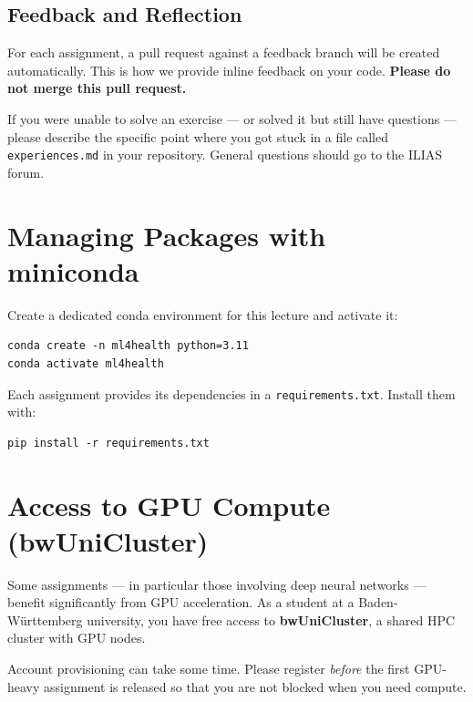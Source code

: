\documentclass[11pt,a4paper]{article}
\begin{document}
\subsection{Feedback and Reflection}

For each assignment, a pull request against a feedback branch will be created automatically. This is how we provide inline feedback on your code. \textbf{Please do not merge this pull request.}

If you were unable to solve an exercise — or solved it but still have questions — please describe the specific point where you got stuck in a file called \texttt{experiences.md} in your repository. General questions should go to the ILIAS forum.

\newpage

\section{Managing Packages with miniconda}

Create a dedicated conda environment for this lecture and activate it:

\begin{lstlisting}
conda create -n ml4health python=3.11
conda activate ml4health
\end{lstlisting}

Each assignment provides its dependencies in a \texttt{requirements.txt}. Install them with:

\begin{lstlisting}
pip install -r requirements.txt
\end{lstlisting}

\section{Access to GPU Compute (bwUniCluster)}

Some assignments — in particular those involving deep neural networks — benefit significantly from GPU acceleration. As a student at a Baden-Württemberg university, you have free access to \textbf{bwUniCluster}, a shared HPC cluster with GPU nodes.

\begin{tcolorbox}[importantbox, title={Register Early}]
Account provisioning can take some time. Please register \emph{before} the first GPU-heavy assignment is released so that you are not blocked when you need compute.
\end{tcolorbox}
\end{document}
